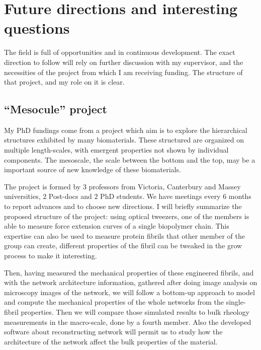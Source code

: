 \section{Future directions and interesting questions}

The field is full of opportunities and in continuous development. The exact
direction to follow will rely on further discussion with my supervisor, and the necessities
of the project from which I am receiving funding. The structure of that project,
and my role on it is clear.

\subsection{``Mesocule'' project}
My PhD fundings come from a project which aim is to explore the hierarchical
structures exhibited by many biomaterials. These structured are organized on
multiple length-scales, with emergent properties not shown by individual
components. The mesoscale, the scale between the bottom and the top, may be  a
important source of new knowledge of these biomaterials.

The project is formed by
$3$ professors from Victoria, Canterbury and Massey universities, $2$ Post-docs
 and $2$ PhD students. We have meetings every $6$ months to report advances and
 to choose new directions.
I will briefly summarize the proposed structure of the project: using optical
tweezers, one of the members is able to  measure force
extension curves of a single biopolymer chain. This expertise can also be  used
to measure protein fibrils that other member of the group can create,  different
properties of the fibril can be tweaked in the grow process to make it
interesting.

Then, having measured the mechanical properties of these engineered
fibrils, and with the network architecture information, gathered after doing
image analysis on microscopy images of the network, we will follow a
bottom-up approach \citep{brown_multiscale_2009,schuster_investigating_2012} to
model and compute the mechanical properties of the whole networks from the single-fibril properties.
Then we will compare those simulated results to
bulk rheology measurements in the macro-scale, done by a fourth member.
Also the developed software about reconstructing network will permit us to 
study how the architecture of the network affect the bulk properties of the material.
 





